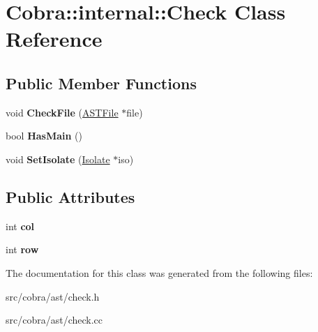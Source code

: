 \hypertarget{class_cobra_1_1internal_1_1_check}{\section{Cobra\+:\+:internal\+:\+:Check Class Reference}
\label{class_cobra_1_1internal_1_1_check}
}
\subsection*{Public Member Functions}
\begin{DoxyCompactItemize}
\item 
\hypertarget{class_cobra_1_1internal_1_1_check_aceadf25dcbd139918ddcc751dddadaed}{void {\bfseries Check\+File} (\hyperlink{class_cobra_1_1internal_1_1_a_s_t_file}{A\+S\+T\+File} $\ast$file)}\label{class_cobra_1_1internal_1_1_check_aceadf25dcbd139918ddcc751dddadaed}

\item 
\hypertarget{class_cobra_1_1internal_1_1_check_a0221d7a96e1581a4e9c9f097c0cb75b7}{bool {\bfseries Has\+Main} ()}\label{class_cobra_1_1internal_1_1_check_a0221d7a96e1581a4e9c9f097c0cb75b7}

\item 
\hypertarget{class_cobra_1_1internal_1_1_check_afb99bd541cf71b4abc5ccfc7a583a7c2}{void {\bfseries Set\+Isolate} (\hyperlink{class_cobra_1_1internal_1_1_isolate}{Isolate} $\ast$iso)}\label{class_cobra_1_1internal_1_1_check_afb99bd541cf71b4abc5ccfc7a583a7c2}

\end{DoxyCompactItemize}
\subsection*{Public Attributes}
\begin{DoxyCompactItemize}
\item 
\hypertarget{class_cobra_1_1internal_1_1_check_a5ac845f4fe07186c2b175c5021cf3205}{int {\bfseries col}}\label{class_cobra_1_1internal_1_1_check_a5ac845f4fe07186c2b175c5021cf3205}

\item 
\hypertarget{class_cobra_1_1internal_1_1_check_aa5dab76efd3b801cd18d56b0806ca020}{int {\bfseries row}}\label{class_cobra_1_1internal_1_1_check_aa5dab76efd3b801cd18d56b0806ca020}

\end{DoxyCompactItemize}


The documentation for this class was generated from the following files\+:\begin{DoxyCompactItemize}
\item 
src/cobra/ast/check.\+h\item 
src/cobra/ast/check.\+cc\end{DoxyCompactItemize}
